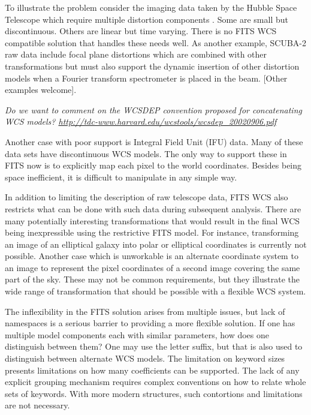 \documentclass[final,authoryear,5p,times,twocolumn]{elsarticle}
\begin{document}
{{To illustrate the problem consider the imaging data taken by the 
Hubble Space Telescope which require multiple distortion components \citep[see e.g.,][]{2013ASPC..475...49H}.
Some are small but discontinuous. Others are linear but time varying.
There is no FITS WCS compatible solution that handles these needs well.
As another example, SCUBA-2 raw data \citep[see
e.g.,][]{2013MNRAS.430.2513H} include focal plane distortions which are
combined with other transformations but must also support the dynamic
insertion of other distortion models when a Fourier transform
spectrometer \citep{2010SPIE.7741E..67G} is placed in the beam.
{\color{red} [Other examples welcome]}.


\textit{\color{red} Do we want to comment on the WCSDEP convention proposed for
  concatenating WCS models? \url{http://tdc-www.harvard.edu/wcstools/wcsdep_20020906.pdf}}

Another case with poor support is Integral Field Unit (IFU) data.
Many of these data sets
have discontinuous WCS models. The only way to support these in FITS
now is to explicitly map each pixel to the world coordinates. Besides
being space inefficient, it is difficult to manipulate in any simple
way.


In addition to limiting the description of raw telescope data, FITS
WCS also restricts what can be done with such data during subsequent
analysis. There are many potentially interesting transformations that
would result in the final WCS being inexpressible using the
restrictive FITS model. For instance, transforming an image of an
elliptical galaxy into polar or elliptical coordinates is currently not possible. Another
case which is unworkable is an alternate coordinate system to an image to
represent the pixel coordinates of a second image covering the same
part of the sky.  These may not be common requirements, but they
illustrate the wide range of transformation that should be possible
with a flexible WCS system.


The inflexibility in the FITS solution arises from multiple issues,
but lack of namespaces is a serious barrier to providing a more
flexible solution. If one has multiple model components each with
similar parameters, how does one distinguish between them? One may use
the letter suffix, but that is also used to distinguish between
alternate WCS models. The limitation on keyword sizes presents
limitations on how many coefficients can be supported. The lack of any
explicit grouping mechanism requires complex conventions on how to
relate whole sets of keywords. With more modern structures, such
contortions and limitations are not necessary.


}}
\end{document}
